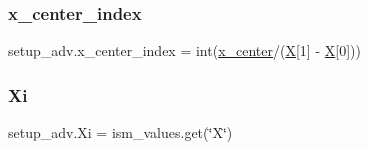 \subsubsection{\texorpdfstring{x\+\_\+center\+\_\+index}{x\_center\_index}}
{\footnotesize\ttfamily setup\+\_\+adv.\+x\+\_\+center\+\_\+index = int(\hyperlink{namespacesetup__adv_affa314aa4c3619c6df4ab64ad91ddfe4}{x\+\_\+center}/(\hyperlink{namespacesetup__adv_a6d9cd2ec966fe51739f30fabc346a12b}{X}\mbox{[}1\mbox{]} -\/ \hyperlink{namespacesetup__adv_a6d9cd2ec966fe51739f30fabc346a12b}{X}\mbox{[}0\mbox{]}))}

\mbox{\label{namespacesetup__adv_a90b1d04e08f3f7e3038cdbfb758ef399}} 
\subsubsection{\texorpdfstring{Xi}{Xi}}
{\footnotesize\ttfamily setup\+\_\+adv.\+Xi = ism\+\_\+values.\+get(\char`\"{}X\char`\"{})}

